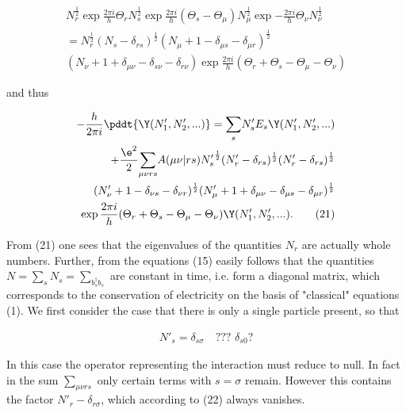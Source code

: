 \documentclass{article}
\newcommand{\nequ}[2]{
\begin{align*}
#1
\tag{#2}
\end{align*}
}
\newcommand{\sumX}[1]{\underset{#1}{\sum}}
\begin{document}
\nequ{
N_r^{\frac{1}{2}}\exp{\frac{2\pi i}{h}\Theta_r}
N_s^{\frac{1}{2}}\exp{\frac{2\pi i}{h}(\Theta_s - \Theta_\mu)}N_\mu^{\frac{1}{2}}
\exp{-\frac{2\pi i}{h}\Theta_\nu}N_\nu^{\frac{1}{2}} \\
= N_r^{\frac{1}{2}}(N_s - \delta_{r s})^{\frac{1}{2}}
(N_\mu + 1 - \delta_{\mu s} - \delta_{\mu r})^{\frac{1}{2}} \\
(N_\nu + 1 + \delta_{\mu\nu} - \delta_{s \nu} - \delta_{r \nu})
\exp{\frac{2\pi i}{h}(\Theta_r + \Theta_s - \Theta_\mu - \Theta_\nu)}
}{20}
and thus
\nequ{
-\frac{h}{2\pi i}\pddt{\Y(N'_1,N'_2,...)} = \sumX{s}N'_s E_s \Y(N'_1, N'_2,...)\\
+ \frac{\e^2}{2}\sumX{\mu\nu r s}A(\mu\nu|r s){N'_s}^{\frac{1}{2}}
(N'_r - \delta_{r s})^{\frac{1}{2}}(N'_r - \delta_{r s})^{\frac{1}{2}}\\
(N'_\nu + 1 - \delta_{\nu s} - \delta_{\nu r})^{\frac{1}{2}}
(N'_\mu + 1 + \delta_{\mu \nu} - \delta_{\mu s} - \delta_{\mu r})^{\frac{1}{2}}\\
\exp{\frac{2\pi i}{h}(\Theta_r + \Theta_s - \Theta_\mu - \Theta_\nu)} \Y(N'_1,N'_2,...).
}{21}

From (21) one sees that the eigenvalues of the quantities $N_r$ are actually whole numbers. Further, from the equations (15) easily follows that the quantities $N = \sumX{s}N_s = \sumX{b_s^\dagger b_s}$ are constant in time, i.e. form a diagonal matrix, which corresponds to the conservation of electricity on the basis of "classical" equations (1). We first consider the case that there is only a single particle present, so that 
\nequ{
N'_s = \delta_{s \sigma}\quad\text{??? $\delta_{s 0}$?}
}{22}
In this case the operator representing the interaction must reduce to null. In fact in the sum $\sumX{\mu\nu r s}$ only certain terms with $s = \sigma$ remain. However this contains the factor $N'_r - \delta_{r \sigma}$, which according to (22) always vanishes.
\end{document}

